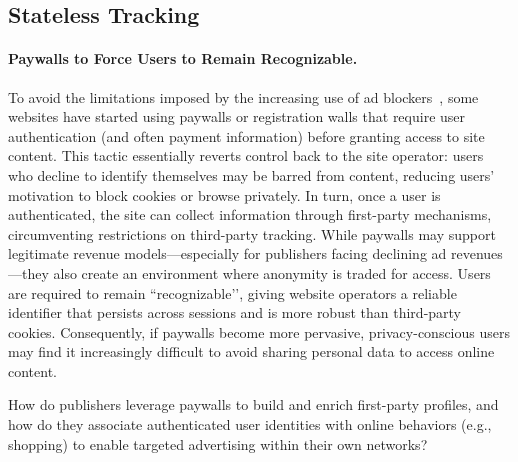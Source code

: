 
\subsection{Stateless Tracking}

\paragraph{Paywalls to Force Users to Remain Recognizable.}
To avoid the limitations imposed by the increasing use of ad blockers~\cite{koreacopyrightcommissionNumberAdblockUsers2024}, some websites have started using paywalls or registration walls that require user authentication (and often payment information) before granting access to site content.
%
This tactic essentially reverts control back to the site operator: users who decline to identify themselves may be barred from content, reducing users' motivation to block cookies or browse privately.
%
In turn, once a user is authenticated, the site can collect information through first-party mechanisms, circumventing restrictions on third-party tracking.
%
While paywalls may support legitimate revenue models---especially for publishers facing declining ad revenues---they also create an environment where anonymity is traded for access.
%
Users are required to remain ``recognizable’’, giving website operators a reliable identifier that persists across sessions and is more robust than third-party cookies.
%
Consequently, if paywalls become more pervasive, privacy-conscious users may find it increasingly difficult to avoid sharing personal data to access online content.

\begin{opbox}
How do publishers leverage paywalls to build and enrich first-party profiles, and how do they associate authenticated user identities with online behaviors (e.g., shopping) to enable targeted advertising within their own networks?
\end{opbox}

